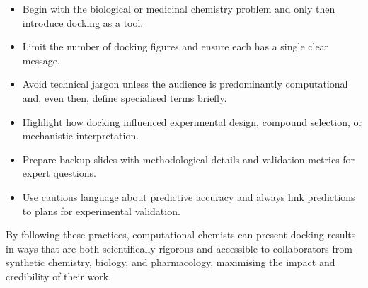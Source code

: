 \documentclass[12pt]{article}
\begin{document}
\begin{itemize}
  \item Begin with the biological or medicinal chemistry problem and only then introduce docking as a tool.\cite{CH11_Kitchen2004,CH11_Forli2015,CH11_zhu2022}
  \item Limit the number of docking figures and ensure each has a single clear message.\cite{CH11_Berry2015,CH11_Forli2015,CH11_cosconati2010}
  \item Avoid technical jargon unless the audience is predominantly computational and, even then, define specialised terms briefly.\cite{CH11_Berry2015,CH11_Cheng2012,CH11_zhu2022}
  \item Highlight how docking influenced experimental design, compound selection, or mechanistic interpretation.\cite{CH11_Forli2015,CH11_Kitchen2004,CH11_zhu2022}
  \item Prepare backup slides with methodological details and validation metrics for expert questions.\cite{CH11_Warren2006,CH11_Forli2015,CH11_ConsensusDocking2023}
  \item Use cautious language about predictive accuracy and always link predictions to plans for experimental validation.\cite{CH11_BindingAffinity2018,CH11_IsItReliable2018,CH11_Cheng2012}
\end{itemize}

By following these practices, computational chemists can present docking results in ways that are both scientifically rigorous and accessible to collaborators from synthetic chemistry, biology, and pharmacology, maximising the impact and credibility of their work.\cite{CH11_Kitchen2004,CH11_Forli2015,CH11_zhu2022} 



\end{document}
